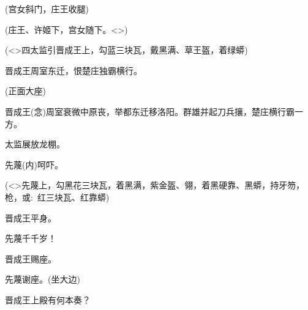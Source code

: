 {(宫女{\hwfs 斜门}，庄王{\hwfs 收腿})


(庄王、许姬{\hwfs 下}，宫女{\hwfs 随下}。\textless{}\!\textgreater{})

\vspace{5pt}

(\textless{}\!\textgreater{}{\hwfs 四}太监{\hwfs 引}晋成王{\hwfs 上}，勾蓝三块瓦，戴黑满、草王盔，{\hwfs 着}绿蟒)

晋成王\hspace{20pt}{[}{\akai 引}{]}周室东迁，恨楚庄独霸横行。

({\hwfs 正面大座})

晋成王\hspace{20pt}({\akai 念})周室衰微中原丧，举都东迁移洛阳。群雄并起刀兵攘，楚庄横行霸一方。


太监\hspace{30pt}展放龙棚。

先蔑\hspace{30pt}({\akai 内})呵吓。

(\textless{}\!\textgreater{}先蔑{\hwfs 上}，勾黑花三块瓦，{\hwfs 着}黑满，紫金盔、翎，着黑硬靠、黑蟒，{\hwfs 持}牙笏，枪，{\akai 或}:~红三块瓦、红靠蟒)


晋成王\hspace{20pt}平身。

先蔑\hspace{30pt}千千岁！

晋成王\hspace{20pt}赐座。

先蔑\hspace{30pt}谢座。({\hwfs 坐大边})

晋成王\hspace{20pt}上殿有何本奏？

}

